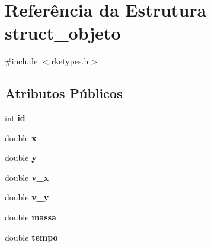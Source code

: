 \hypertarget{structstruct__objeto}{\section{Referência da Estrutura struct\-\_\-objeto}
\label{structstruct__objeto}
}


{\ttfamily \#include $<$rketypes.\-h$>$}

\subsection*{Atributos Públicos}
\begin{DoxyCompactItemize}
\item 
\hypertarget{structstruct__objeto_ae9a037428a08fe5da343c4b1e7fd0fd3}{int {\bfseries id}}\label{structstruct__objeto_ae9a037428a08fe5da343c4b1e7fd0fd3}

\item 
\hypertarget{structstruct__objeto_a57918c6d0afe11d4ca083ce703d76b61}{double {\bfseries x}}\label{structstruct__objeto_a57918c6d0afe11d4ca083ce703d76b61}

\item 
\hypertarget{structstruct__objeto_aa8b1a98f80f1e829c62b5fffebd208e9}{double {\bfseries y}}\label{structstruct__objeto_aa8b1a98f80f1e829c62b5fffebd208e9}

\item 
\hypertarget{structstruct__objeto_a7c92e76fa78668f2c0af5a3175c75e02}{double {\bfseries v\-\_\-x}}\label{structstruct__objeto_a7c92e76fa78668f2c0af5a3175c75e02}

\item 
\hypertarget{structstruct__objeto_a390828a2ff2afc40b8cd5626f44b6359}{double {\bfseries v\-\_\-y}}\label{structstruct__objeto_a390828a2ff2afc40b8cd5626f44b6359}

\item 
\hypertarget{structstruct__objeto_a5a369e87a31b1d5c611f59edecaabe17}{double {\bfseries massa}}\label{structstruct__objeto_a5a369e87a31b1d5c611f59edecaabe17}

\item 
\hypertarget{structstruct__objeto_a2ebeaca5f84d6e41bcd8932c76ed3126}{double {\bfseries tempo}}\label{structstruct__objeto_a2ebeaca5f84d6e41bcd8932c76ed3126}

\end{DoxyCompactItemize}


